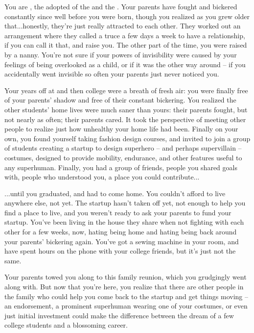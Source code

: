 \documentclass[char]{LRSguildcamp1}
\begin{document}
\name{\cGrad{}}
You are \cGrad{\intro}, the adopted \cGrad{\offspring} of the \cOldest{\villain} \cOldest{\intro} and the \cOS{\hero} \cOS{\intro}.  Your parents have fought and bickered constantly since well before you were born, though you realized as you grew older that...honestly, they're just really attracted to each other.  They worked out an arrangement where they called a truce a few days a week to have a relationship, if you can call it that, and raise you.  The other part of the time, you were raised by a nanny.  You're not sure if your powers of invisibility were caused by your feelings of being overlooked as a child, or if it was the other way around -- if you accidentally went invisible so often your parents just never noticed you. 

Your years off at \pSuperSchool{} and then college were a breath of fresh air: you were finally free of your parents' shadow and free of their constant bickering.  You realized the other students' home lives were much saner than yours: their parents fought, but not nearly as often; their parents cared.  It took the perspective of meeting other people to realize just how unhealthy your home life had been.  Finally on your own, you found yourself taking fashion design courses, and invited to join a group of students creating a startup to design superhero -- and perhaps supervillain -- costumes, designed to provide mobility, endurance, and other features useful to any superhuman.  Finally, you had a group of friends, people you shared goals with, people who understood you, a place you could contribute...

...until you graduated, and had to come home.  You couldn't afford to live anywhere else, not yet.  The startup hasn't taken off yet, not enough to help you find a place to live, and you weren't ready to ask your parents to fund your startup.  You've been living in the house they share when not fighting with each other for a few weeks, now, hating being home and hating being back around your parents' bickering again.  You've got a sewing machine in your room, and have spent hours on the phone with your college friends, but it's just not the same.

Your parents towed you along to this family reunion, which you grudgingly went along with.  But now that you're here, you realize that there are other people in the family who could help you come back to the startup and get things moving -- an endorsement, a prominent superhuman wearing one of your costumes, or even just initial investment could make the difference between the dream of a few college students and a blossoming career.
\end{document}
